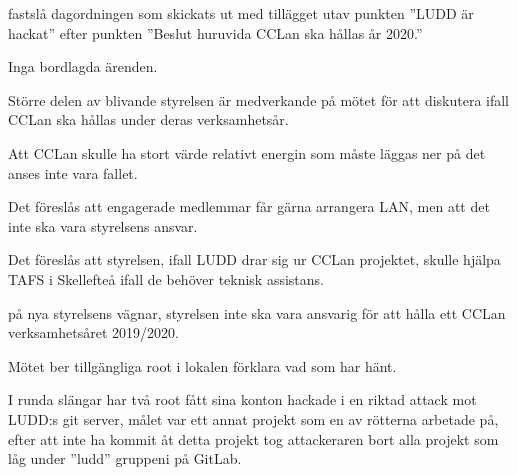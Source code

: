 \documentclass{protokoll}
\date{2019-04-24}  %
\begin{document}
\newpage  


\begin{beslut}
     \att fastslå dagordningen som skickats ut med tillägget utav punkten 
     ''LUDD är hackat'' efter punkten ''Beslut huruvida CCLan ska hållas år
     2020.''
\end{beslut}

Inga bordlagda ärenden.

Större delen av blivande styrelsen är medverkande på mötet för att diskutera
ifall CCLan ska hållas under deras verksamhetsår. 

Att CCLan skulle ha stort värde relativt energin som måste läggas ner på det
anses inte vara fallet. 

Det föreslås att engagerade medlemmar får gärna arrangera LAN, men att det inte
ska vara styrelsens ansvar.

Det föreslås att styrelsen, ifall LUDD drar sig ur CCLan projektet, skulle
hjälpa TAFS i Skellefteå ifall de behöver teknisk assistans. 

\begin{beslut}
  \att på nya styrelsens vägnar, styrelsen inte ska vara ansvarig för att hålla
  ett CCLan verksamhetsåret 2019/2020.
\end{beslut}

Mötet ber tillgängliga root i lokalen förklara vad som har hänt.  

I runda slängar har två root fått sina konton hackade i en riktad attack mot
LUDD:s git server, målet var ett annat projekt som en av rötterna arbetade på,
efter att inte ha kommit åt detta projekt tog attackeraren bort alla projekt
som låg under ''ludd'' gruppeni på GitLab. 
\end{document}
